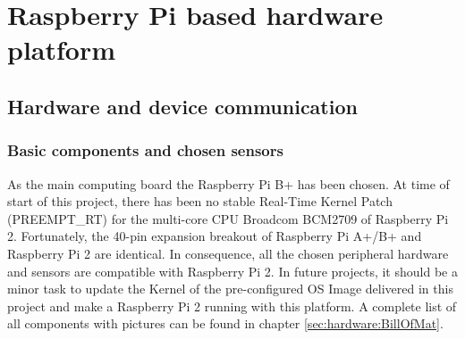 \chapter{Raspberry Pi based hardware platform}
\label{sec:hardware}
\section{Hardware and device communication}
\label{sec:hardware:Hardware}

\subsection{Basic components and chosen sensors}
\label{sec:hardware:Components}

As the main computing board the Raspberry Pi B+ has been chosen. At time of start of this project, there has been no stable Real-Time Kernel Patch (PREEMPT\_RT) for the multi-core CPU Broadcom BCM2709 of Raspberry Pi 2. Fortunately, the 40-pin expansion breakout of Raspberry Pi A+/B+ and Raspberry Pi 2 are identical. In consequence, all the chosen peripheral hardware and sensors are compatible with Raspberry Pi 2. In future projects, it should be a minor task to update the Kernel of the pre-configured OS Image delivered in this project and make a Raspberry Pi 2 running with this platform. A complete list of all components with pictures can be found in chapter \ref{sec:hardware:BillOfMat}.

